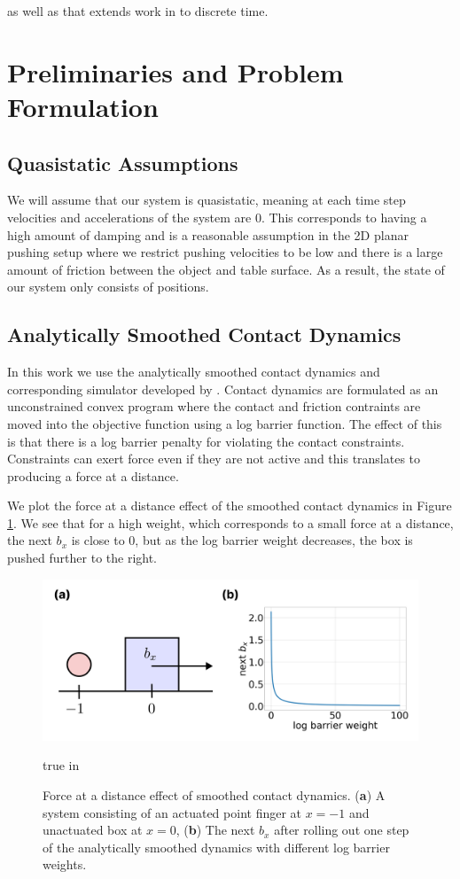 \documentclass[conference]{IEEEtran}
\begin{document}
as well as \autocite{weiControlContractionMetric2021} that extends work in \autocite{manchesterControlContractionMetrics2017} to discrete time.

\section{Preliminaries and Problem Formulation}
\subsection{Quasistatic Assumptions}
We will assume that our system is quasistatic, meaning at each time step velocities and accelerations of the system are 0. This corresponds to having a high amount of damping and is a reasonable assumption in the 2D planar pushing setup where we restrict pushing velocities to be low and there is a large amount of friction between the object and table surface. As a result, the state of our system only consists of positions.

\subsection{Analytically Smoothed Contact Dynamics}
In this work we use the analytically smoothed contact dynamics and corresponding simulator developed by \autocite{pangGlobalPlanningContactRich2023}. Contact dynamics are formulated as an unconstrained convex program where the contact and friction contraints are moved into the objective function using a log barrier function. The effect of this is that there is a log barrier penalty for violating the contact constraints. Constraints can exert force even if they are not active and this translates to producing a force at a distance.

We plot the force at a distance effect of the smoothed contact dynamics in Figure \ref{fig:smoothed_contact_dynamics}. We see that for a high weight, which corresponds to a small force at a distance, the next $b_x$ is close to 0, but as the log barrier weight decreases, the box is pushed further to the right.

\begin{figure}[t]
	\centering\includegraphics[width = 0.45 \textwidth]
	{figures/smoothed_contact_dynamics.png}
    \caption{Force at a distance effect of smoothed contact dynamics. (\textbf{a}) A system consisting of an actuated point finger at $x=-1$ and unactuated box at $x=0$, (\textbf{b}) The next $b_x$ after rolling out one step of the analytically smoothed dynamics with different log barrier weights.}
	\label{fig:smoothed_contact_dynamics}
	 true in
\end{figure}
\end{document}
